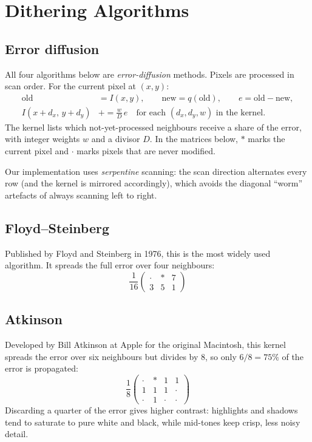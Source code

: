 \documentclass[11pt,a4paper]{article}
\begin{document}
\section{Dithering Algorithms}
\label{sec:algorithms}

\subsection{Error diffusion}

All four algorithms below are \emph{error-diffusion} methods. Pixels are
processed in scan order. For the current pixel at $(x,y)$:
\begin{align}
  \text{old} &= I(x,y), \qquad \text{new} = q(\text{old}), \qquad
  e = \text{old} - \text{new}, \\
  I(x+d_x,\,y+d_y) &\mathrel{+}= \frac{w}{D}\, e
  \quad \text{for each } (d_x,d_y,w) \text{ in the kernel.}
\end{align}
The kernel lists which not-yet-processed neighbours receive a share of the
error, with integer weights $w$ and a divisor $D$. In the matrices below,
$\ast$ marks the current pixel and $\cdot$ marks pixels that are never
modified.

Our implementation uses \emph{serpentine} scanning: the scan direction
alternates every row (and the kernel is mirrored accordingly), which avoids
the diagonal ``worm'' artefacts of always scanning left to right.

\subsection{Floyd--Steinberg}
\label{sec:fs}

Published by Floyd and Steinberg in 1976, this is the most widely used
algorithm. It spreads the full error over four neighbours:
\begin{equation}
  \frac{1}{16}
  \begin{pmatrix}
    \cdot & \ast & 7 \\
    3 & 5 & 1
  \end{pmatrix}
\end{equation}

\subsection{Atkinson}
\label{sec:atkinson}

Developed by Bill Atkinson at Apple for the original Macintosh, this kernel
spreads the error over six neighbours but divides by 8, so only
$6/8 = 75\%$ of the error is propagated:
\begin{equation}
  \frac{1}{8}
  \begin{pmatrix}
    \cdot & \ast & 1 & 1 \\
    1 & 1 & 1 & \cdot \\
    \cdot & 1 & \cdot & \cdot
  \end{pmatrix}
\end{equation}
Discarding a quarter of the error gives higher contrast: highlights and
shadows tend to saturate to pure white and black, while mid-tones keep
crisp, less noisy detail.
\end{document}
